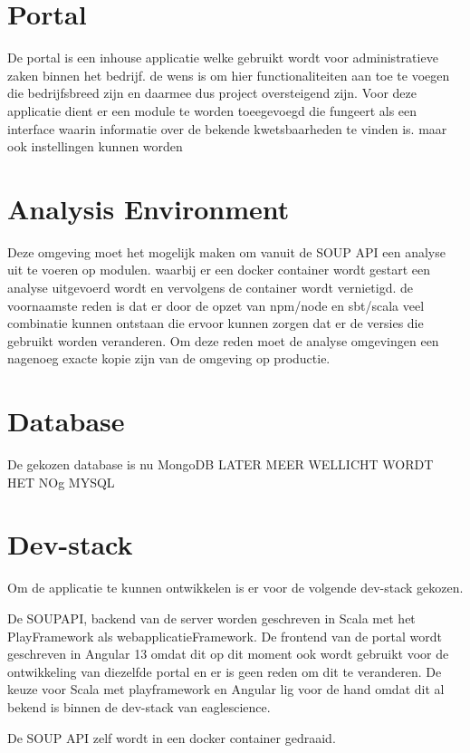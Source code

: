 \section{Portal}\label{sec:portal} De portal is een inhouse applicatie welke gebruikt wordt voor administratieve zaken binnen het bedrijf. de wens is om hier functionaliteiten aan toe te voegen die bedrijfsbreed zijn en daarmee dus project oversteigend zijn. Voor deze applicatie dient er een module te worden toeegevoegd die fungeert als een interface waarin informatie over de bekende kwetsbaarheden te vinden is. maar ook instellingen kunnen worden

\section{Analysis Environment}\label{sec:analysis-environment}
Deze omgeving moet het mogelijk maken om vanuit de SOUP API een analyse uit te voeren op modulen. waarbij er een docker container wordt gestart een analyse uitgevoerd wordt en vervolgens de container wordt vernietigd. de voornaamste reden is dat er door de opzet van npm/node en sbt/scala veel combinatie kunnen ontstaan die ervoor kunnen zorgen dat er de versies die gebruikt worden veranderen. Om deze reden moet de analyse omgevingen een nagenoeg exacte kopie zijn van de omgeving op productie.


\section{Database}\label{sec:database} De gekozen database is nu MongoDB LATER MEER WELLICHT WORDT HET NOg MYSQL



\section{Dev-stack}\label{sec:dev-stack}

Om de applicatie te kunnen ontwikkelen is er voor de volgende dev-stack gekozen.

De SOUPAPI, backend van de server worden geschreven in Scala met het PlayFramework als webapplicatieFramework. De frontend van de portal wordt geschreven in Angular 13 omdat dit op dit moment ook wordt gebruikt voor de ontwikkeling van diezelfde portal en er is geen reden om dit te veranderen.
De keuze voor Scala met playframework en Angular lig voor de hand omdat dit al bekend is binnen de dev-stack van eaglescience.

De SOUP API zelf wordt in een docker container gedraaid.
